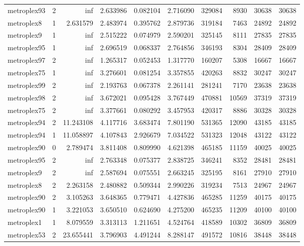 \begin{longtable}{|l|r|r|r|r|r|r|r|r|r|}
metroplex93 & 2 & inf & 2.633986 & 0.082104 & 2.716090 & 329084 & 8930 & 30638 & 30638 \\
metroplex8 & 1 & 2.631579 & 2.483974 & 0.395762 & 2.879736 & 319184 & 7463 & 24892 & 24892 \\
metroplex9 & 1 & inf & 2.515222 & 0.074979 & 2.590201 & 325145 & 8111 & 27835 & 27835 \\
metroplex95 & 1 & inf & 2.696519 & 0.068337 & 2.764856 & 346193 & 8304 & 28409 & 28409 \\
metroplex97 & 2 & inf & 1.265317 & 0.052453 & 1.317770 & 160207 & 5308 & 16667 & 16667 \\
metroplex75 & 1 & inf & 3.276601 & 0.081254 & 3.357855 & 420263 & 8832 & 30247 & 30247 \\
metroplex99 & 2 & inf & 2.193763 & 0.067378 & 2.261141 & 281241 & 7170 & 23638 & 23638 \\
metroplex98 & 2 & inf & 3.672021 & 0.095428 & 3.767449 & 470881 & 10569 & 37319 & 37319 \\
metroplex75 & 2 & inf & 3.377661 & 0.080292 & 3.457953 & 420317 & 8886 & 30328 & 30328 \\
metroplex94 & 2 & 11.243108 & 4.117716 & 3.683474 & 7.801190 & 531365 & 12090 & 43185 & 43185 \\
metroplex94 & 1 & 11.058897 & 4.107843 & 2.926679 & 7.034522 & 531323 & 12048 & 43122 & 43122 \\
metroplex90 & 0 & 2.789474 & 3.811408 & 0.809990 & 4.621398 & 465185 & 11159 & 40025 & 40025 \\
metroplex95 & 2 & inf & 2.763348 & 0.075377 & 2.838725 & 346241 & 8352 & 28481 & 28481 \\
metroplex9 & 2 & inf & 2.587694 & 0.075551 & 2.663245 & 325195 & 8161 & 27910 & 27910 \\
metroplex8 & 2 & 2.263158 & 2.480882 & 0.509344 & 2.990226 & 319234 & 7513 & 24967 & 24967 \\
metroplex90 & 2 & 3.105263 & 3.648365 & 0.779471 & 4.427836 & 465285 & 11259 & 40175 & 40175 \\
metroplex90 & 1 & 3.221053 & 3.650510 & 0.624690 & 4.275200 & 465235 & 11209 & 40100 & 40100 \\
metroplex1 & 1 & 8.079559 & 3.313113 & 1.211651 & 4.524764 & 418589 & 10302 & 36809 & 36809 \\
metroplex53 & 2 & 23.655441 & 3.796903 & 4.491244 & 8.288147 & 491572 & 10816 & 38448 & 38448 \\
\end{longtable}
